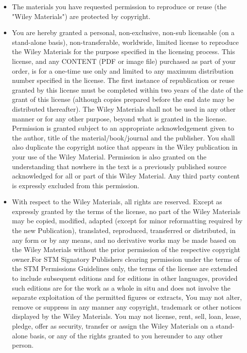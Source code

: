 \begin{itemize}

\item The materials you have requested permission to reproduce or reuse (the "Wiley Materials") are protected by copyright.

\item You are hereby granted a personal, non-exclusive, non-sub licensable (on a stand-alone basis), non-transferable, worldwide, limited license to reproduce the Wiley Materials for the purpose specified in the licensing process. This license, and any CONTENT (PDF or image file) purchased as part of your order, is for a one-time use only and limited to any maximum distribution number specified in the license. The first instance of republication or reuse granted by this license must be completed within two years of the date of the grant of this license (although copies prepared before the end date may be distributed thereafter). The Wiley Materials shall not be used in any other manner or for any other purpose, beyond what is granted in the license. Permission is granted subject to an appropriate acknowledgement given to the author, title of the material/book/journal and the publisher. You shall also duplicate the copyright notice that appears in the Wiley publication in your use of the Wiley Material. Permission is also granted on the understanding that nowhere in the text is a previously published source acknowledged for all or part of this Wiley Material. Any third party content is expressly excluded from this permission.

\item With respect to the Wiley Materials, all rights are reserved. Except as expressly granted by the terms of the license, no part of the Wiley Materials may be copied, modified, adapted (except for minor reformatting required by the new Publication), translated, reproduced, transferred or distributed, in any form or by any means, and no derivative works may be made based on the Wiley Materials without the prior permission of the respective copyright owner.For STM Signatory Publishers clearing permission under the terms of the STM Permissions Guidelines only, the terms of the license are extended to include subsequent editions and for editions in other languages, provided such editions are for the work as a whole in situ and does not involve the separate exploitation of the permitted figures or extracts, You may not alter, remove or suppress in any manner any copyright, trademark or other notices displayed by the Wiley Materials. You may not license, rent, sell, loan, lease, pledge, offer as security, transfer or assign the Wiley Materials on a stand-alone basis, or any of the rights granted to you hereunder to any other person.


\end{itemize}
